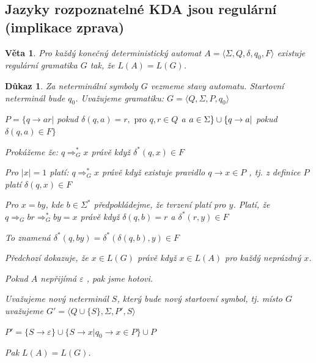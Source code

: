 \documentclass[10pt, a4paper, titlepage]{article}
\theoremstyle{note}
\newtheorem{veta}{\textbf{Věta}}
\newtheorem{dukaz}{\textbf{Důkaz}}
\begin{document}
\subsection{Jazyky rozpoznatelné KDA jsou regulární (implikace zprava)}

\begin{veta} 
Pro každý konečný deterministický automat $A = \langle \Sigma,Q,\delta,q_0,F \rangle$ existuje regulární gramatika $G$ tak, že $L(A)=L(G)$.
\end{veta}

\begin{dukaz}
Za neterminální symboly $G$ vezmeme stavy automatu. Startovní neterminál bude $q_0$. Uvažujeme gramatiku:
$G = \langle Q,\Sigma,P,q_0 \rangle$

$P = \lbrace q \rightarrow ar |$ pokud $\delta (q,a)=r, \text{ pro } q,r \in Q$ a $a \in \Sigma \rbrace \\ \cup \lbrace q \rightarrow a |$ pokud $\delta (q,a) \in F \rbrace$ 

Prokážeme že: $ q \Rightarrow_G^* x $ právě když $ \delta^* (q,x) \in F$

Pro $|x|=1$ platí: $ q \Rightarrow_G^* x $ právě když existuje pravidlo $q \rightarrow x \in P$ , tj. z definice $P$ platí $\delta (q,x) \in F$

Pro $x=by$, kde $b \in \Sigma^*$ předpokládejme, že tvrzení platí pro $y$. Platí, že $q \Rightarrow_G br \Rightarrow_G^* by = x$ právě když $\delta (q,b)=r$ a $\delta^* (r,y) \in F$

To znamená $\delta^* (q,by) = \delta^* ( \delta (q,b),y) \in F$

Předchozí dokazuje, že $x \in L(G)$ právě když $x \in L(A)$ pro každý neprázdný $x$.

Pokud $A$ nepřijímá $\varepsilon$ , pak jsme hotovi.

Uvažujeme nový neterminál $S$, který bude nový startovní symbol, tj. místo $G$ uvažujeme $G'= \langle Q \cup \lbrace S \rbrace,\Sigma,P',S \rangle$

$P'= \lbrace S \rightarrow \varepsilon \rbrace \cup \lbrace S \rightarrow x | q_0 \rightarrow x \in P \rbrace \cup P$

Pak $L(A)=L(G)$.
\end{dukaz}
\end{document}

